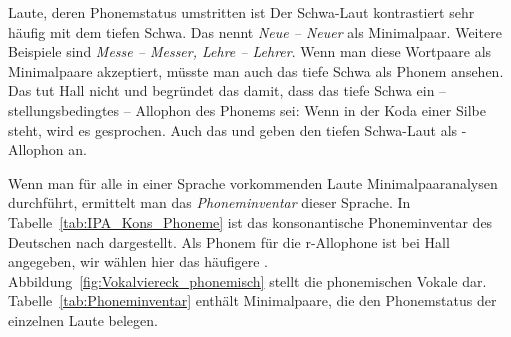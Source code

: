 \begin{Exkurs}{Laute, deren Phonemstatus umstritten ist}
Der Schwa-Laut kontrastiert sehr häufig mit dem tiefen Schwa. Das \citet[35]{DudenAussprache2023} nennt \textit{Neue -- Neuer} als Minimalpaar. Weitere Beispiele sind \textit{Messe -- Messer, Lehre -- Lehrer}. Wenn man diese Wortpaare als Minimalpaare akzeptiert, müsste man auch das tiefe Schwa als Phonem ansehen. Das tut Hall nicht und begründet das damit, dass das tiefe Schwa ein -- stellungsbedingtes -- Allophon des Phonems  sei: Wenn  in der Koda einer Silbe steht, wird es \textipa{[5]} gesprochen. Auch das \citet[35]{DudenAussprache2023} und \citet[58f]{FuhrhopPeters2013} geben den tiefen Schwa-Laut als -Allophon an. 




\end{Exkurs}



Wenn man für alle in einer Sprache vorkommenden Laute Minimalpaaranalysen durchführt, ermittelt man das \textit{Phoneminventar} dieser Sprache. In Tabelle~\ref{tab:IPA_Kons_Phoneme} ist das konsonantische Phoneminventar des Deutschen nach \citet{Hall2000} dargestellt. Als Phonem für die r-Allophone ist bei Hall \textipa{/\textscr/} angegeben, wir wählen hier das häufigere . Abbildung~\ref{fig:Vokalviereck_phonemisch} stellt die phonemischen Vokale dar. Tabelle~\ref{tab:Phoneminventar} enthält Minimalpaare, die den Phonemstatus der einzelnen Laute belegen. 



